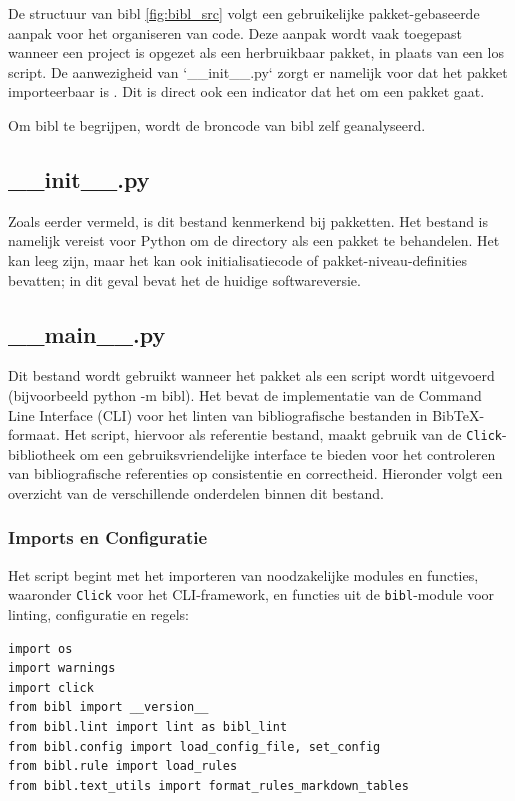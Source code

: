 De structuur van bibl \ref{fig:bibl_src} volgt een gebruikelijke pakket-gebaseerde aanpak voor het organiseren van code. Deze aanpak wordt vaak toegepast wanneer een project is opgezet als een herbruikbaar pakket, in plaats van een los script. De aanwezigheid van `\_\_init\_\_.py` zorgt er namelijk voor dat het pakket importeerbaar is \autocite{Loubser2021}. Dit is direct ook een indicator dat het om een pakket gaat.

Om bibl te begrijpen, wordt de broncode van bibl zelf geanalyseerd.

\subsection{\_\_init\_\_.py}
Zoals eerder vermeld, is dit bestand kenmerkend bij pakketten. Het bestand is namelijk vereist voor Python om de directory als een pakket te behandelen. Het kan leeg zijn, maar het kan ook initialisatiecode of pakket-niveau-definities bevatten; in dit geval bevat het de huidige softwareversie.

\subsection{\_\_main\_\_.py}
Dit bestand wordt gebruikt wanneer het pakket als een script wordt uitgevoerd (bijvoorbeeld python -m bibl). Het bevat de implementatie van de Command Line Interface (CLI) voor het linten van bibliografische bestanden in BibTeX-formaat. Het script, hiervoor als referentie bestand, maakt gebruik van de \texttt{Click}-bibliotheek om een gebruiksvriendelijke interface te bieden voor het controleren van bibliografische referenties op consistentie en correctheid. Hieronder volgt een overzicht van de verschillende onderdelen binnen dit bestand.

\subsubsection{Imports en Configuratie}

Het script begint met het importeren van noodzakelijke modules en functies, waaronder \texttt{Click} voor het CLI-framework, en functies uit de \texttt{bibl}-module voor linting, configuratie en regels:

\begin{verbatim}
import os
import warnings
import click
from bibl import __version__
from bibl.lint import lint as bibl_lint
from bibl.config import load_config_file, set_config
from bibl.rule import load_rules
from bibl.text_utils import format_rules_markdown_tables
\end{verbatim}

